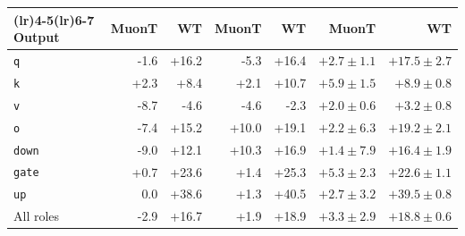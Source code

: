 \begin{table}[tbp]
\begin{tabularx}{\textwidth}{@{}>{\raggedright\arraybackslash}Xrrrrrr@{}}
\cmidrule(lr){2-3}\cmidrule(lr){4-5}\cmidrule(lr){6-7}
Output & MuonT & WT & MuonT & WT & MuonT & WT \\\midrule
\texttt{q} & -1.6 & +16.2 & -5.3 & +16.4 & $+2.7\pm1.1$ & $+17.5\pm2.7$ \\
\texttt{k} & +2.3 & +8.4 & +2.1 & +10.7 & $+5.9\pm1.5$ & $+8.9\pm0.8$ \\
\texttt{v} & -8.7 & -4.6 & -4.6 & -2.3 & $+2.0\pm0.6$ & $+3.2\pm0.8$ \\
\texttt{o} & -7.4 & +15.2 & +10.0 & +19.1 & $+2.2\pm6.3$ & $+19.2\pm2.1$ \\
\texttt{down} & -9.0 & +12.1 & +10.3 & +16.9 & $+1.4\pm7.9$ & $+16.4\pm1.9$ \\
\texttt{gate} & +0.7 & +23.6 & +1.4 & +25.3 & $+5.3\pm2.3$ & $+22.6\pm1.1$ \\
\texttt{up} & 0.0 & +38.6 & +1.3 & +40.5 & $+2.7\pm3.2$ & $+39.5\pm0.8$ \\
\midrule
All roles & -2.9 & +16.7 & +1.9 & +18.9 & $+3.3\pm2.9$ & $+18.8\pm0.6$ \\
\bottomrule\end{tabularx}
\end{table}
